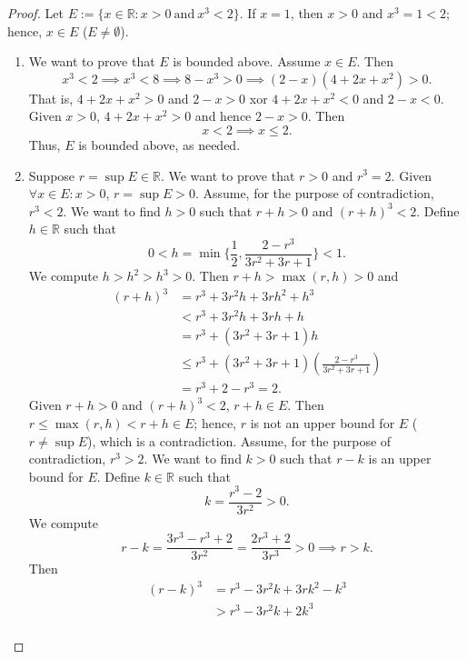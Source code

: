 \documentclass[12pt]{article}
\theoremstyle{definition}
\begin{document}
\begin{proof}
    Let $E := \{x \in \mathbb{R} : x > 0 \ \text{and} \ x^3 < 2\}$. If $x = 1$, then $x > 0$ and $x^3 = 1 < 2$; hence, $x \in E$ ($E \neq \emptyset$). \begin{enumerate}[label=(\alph*)]
        \item We want to prove that $E$ is bounded above. Assume $x \in E$. Then
        \[
            x^3 < 2 \implies x^3 < 8 \implies 8 - x^3 > 0 \implies (2 - x)(4 + 2x + x^2) > 0.
        \]
        That is, $4 + 2x + x^2 > 0$ and $2 - x > 0$ xor $4 + 2x + x^2 < 0$ and $2 - x < 0$. Given $x > 0$, $4 + 2x + x^2 > 0$ and hence $2 - x > 0$. Then 
        \[
            x < 2 \implies x \leq 2.
        \]
        Thus, $E$ is bounded above, as needed.
        \item Suppose $r = \sup E \in \mathbb{R}$. We want to prove that $r > 0$ and $r^3 = 2$. Given $\forall x \in E : x > 0$, $r = \sup E > 0$.
        Assume, for the purpose of contradiction, $r^3 < 2$. We want to find $h > 0$ such that $r + h > 0$ and $(r + h)^3 < 2$. Define $h \in \mathbb{R}$ such that
        \[
            0 < h = \min\bigg\{\frac{1}{2}, \frac{2 - r^3}{3r^2 + 3r + 1}\bigg\} < 1.
        \]
        We compute $h > h^2 > h^3 > 0$. Then $r + h > \max(r,h) > 0$ and
        \begin{align*}
            (r + h)^3 &= r^3 + 3r^2h + 3rh^2 + h^3 \\
            &< r^3 + 3r^2h + 3rh + h \\
            &= r^3 + (3r^2 + 3r + 1)h \\
            &\leq r^3 + (3r^2 + 3r + 1)\left(\frac{2 - r^3}{3r^2 + 3r + 1}\right) \\
            &= r^3 + 2 - r^3 = 2.
        \end{align*}
        Given $r + h > 0$ and $(r + h)^3 < 2$, $r + h \in E$. Then $r \leq \max(r,h) < r + h \in E$; hence, $r$ is not an upper bound for $E$ ($r \neq \sup E$), which is a contradiction. Assume, for the purpose of contradiction, $r^3 > 2$. We want to find $k > 0$ such that $r - k$ is an upper bound for $E$. Define $k \in \mathbb{R}$ such that
        \[
            k = \frac{r^3 - 2}{3r^2} > 0.
        \]
        We compute
        \[
            r - k = \frac{3r^3 - r^3 + 2}{3r^2} = \frac{2r^3 + 2}{3r^3} > 0 \implies r > k.
        \]
        Then
        \begin{align*}
            (r  - k)^3 &= r^3 - 3r^2k + 3rk^2 - k^3 \\
            &> r^3 - 3r^2k + 2k^3 \\

\end{align*}
\end{enumerate}
\end{proof}
\end{document}

